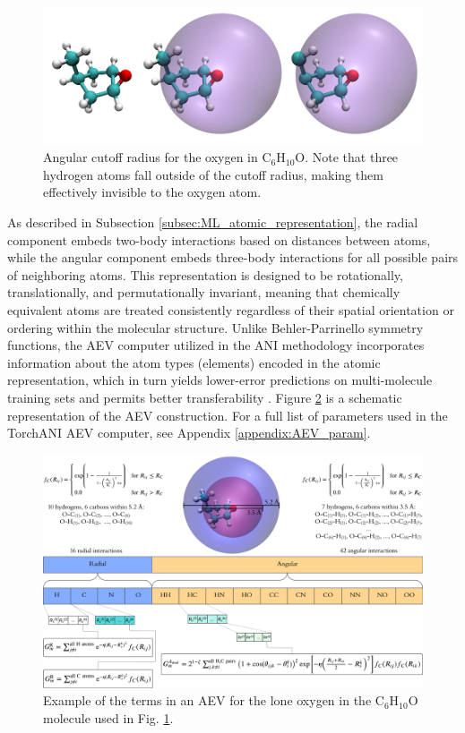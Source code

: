 \begin{figure}[h!]
    \centering
    \includegraphics[width=1\linewidth]{Images/aev_radius/aev_radius_combined.png}
    \caption[Demonstration of AEV angular cutoff radius.]{Angular cutoff radius for the oxygen in C$_6$H$_{10}$O. Note that three hydrogen atoms fall outside of the cutoff radius, making them effectively invisible to the oxygen atom.}
    \label{fig:aev_radius}
\end{figure}

As described in Subsection \ref{subsec:ML_atomic_representation}, the radial component embeds two-body interactions based on distances between atoms, while the angular component embeds three-body interactions for all possible pairs of neighboring atoms.
This representation is designed to be rotationally, translationally, and permutationally invariant, meaning that chemically equivalent atoms are treated consistently regardless of their spatial orientation or ordering within the molecular structure.
Unlike Behler-Parrinello symmetry functions, the AEV computer utilized in the ANI methodology incorporates information about the atom types (elements) encoded in the atomic representation, which in turn yields lower-error predictions on multi-molecule training sets and permits better transferability \cite{ani-1}.
Figure \ref{fig:aev_construction} is a schematic representation of the AEV construction. 
For a full list of parameters used in the TorchANI AEV computer, see Appendix \ref{appendix:AEV_param}.

\begin{figure}[hb]
    \centering
    \includegraphics[width=1\linewidth]{Images/aev_radius/AEV_construction.png}
    \caption[Example of atomic environment vector construction]{Example of the terms in an AEV for the lone oxygen in the C$_6$H$_{10}$O molecule used in Fig. \ref{fig:aev_radius}.}
    \label{fig:aev_construction}
\end{figure}

